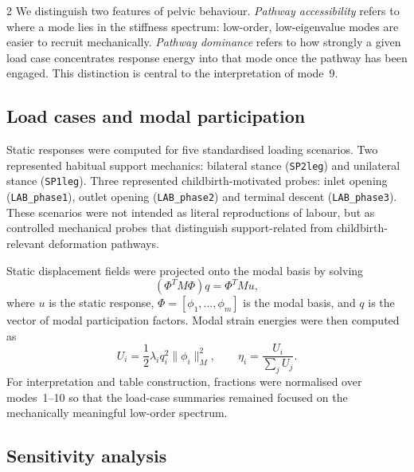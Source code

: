 \documentclass[openacc]{rsproca_new}
\begin{document}
\begin{multicols}{2}
We distinguish two features of pelvic behaviour. \emph{Pathway accessibility} refers to where a mode lies in the stiffness spectrum: low-order, low-eigenvalue modes are easier to recruit mechanically. \emph{Pathway dominance} refers to how strongly a given load case concentrates response energy into that mode once the pathway has been engaged. This distinction is central to the interpretation of mode~9.

\subsection{Load cases and modal participation}

Static responses were computed for five standardised loading scenarios. Two represented habitual support mechanics: bilateral stance (\texttt{SP2leg}) and unilateral stance (\texttt{SP1leg}). Three represented childbirth-motivated probes: inlet opening (\texttt{LAB\_phase1}), outlet opening (\texttt{LAB\_phase2}) and terminal descent (\texttt{LAB\_phase3}). These scenarios were not intended as literal reproductions of labour, but as controlled mechanical probes that distinguish support-related from childbirth-relevant deformation pathways.

Static displacement fields were projected onto the modal basis by solving
\begin{equation}
(\Phi^{T}M\Phi)q = \Phi^{T}Mu,
\end{equation}
where $u$ is the static response, $\Phi=[\phi_{1},\ldots,\phi_{m}]$ is the modal basis, and $q$ is the vector of modal participation factors. Modal strain energies were then computed as
\begin{equation}
U_{i}=\frac{1}{2}\lambda_{i}q_{i}^{2}\|\phi_{i}\|_{M}^{2}, \qquad
\eta_{i}=\frac{U_{i}}{\sum_{j}U_{j}}.
\end{equation}
For interpretation and table construction, fractions were normalised over modes~1--10 so that the load-case summaries remained focused on the mechanically meaningful low-order spectrum.

\subsection{Sensitivity analysis}


\end{multicols}
\end{document}
